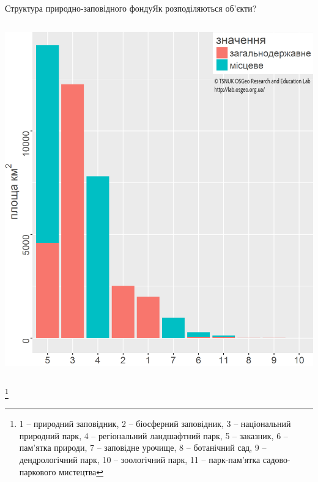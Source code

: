 \documentclass[12pt, aspectratio=1610]{beamer}
\newcommand\blfootnote[1]{%
	\begingroup
	\renewcommand\thefootnote{}\footnote{#1}%
	\addtocounter{footnote}{-1}%
	\endgroup
}
\begin{document}
\begin{frame}{Структура природно-заповідного фонду}{Як розподіляються об'єкти?}
\begin{columns}[c]
		\includegraphics[width=\textwidth]{./figures/area.png}
			
\end{columns}
\blfootnote{\tiny{1 -- природний заповідник, 2 -- біосферний заповідник, 3 -- національний природний парк, 4 -- регіональний ландшафтний парк, 5 -- заказник, 6 -- пам’ятка природи, 7 -- заповідне урочище, 8 -- ботанічний сад, 9 -- дендрологічний парк, 10 -- зоологічний парк, 11 -- парк-пам’ятка садово-паркового мистецтва}}	
\end{frame}
\end{document}
